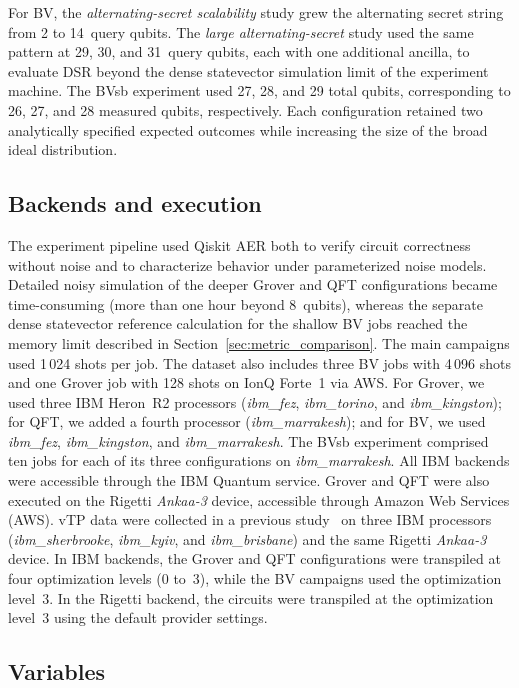 \documentclass[pdflatex,sn-mathphys-num]{sn-jnl}
\theoremstyle{thmstyleone}%
\theoremstyle{thmstyletwo}%
\theoremstyle{thmstylethree}%
\begin{document}
For BV, the \emph{alternating-secret scalability} study grew the alternating secret string from 2 to 14~query qubits. The \emph{large alternating-secret} study used the same pattern at 29, 30, and 31~query qubits, each with one additional ancilla, to evaluate DSR beyond the dense statevector simulation limit of the experiment machine. The BVsb experiment used 27, 28, and 29 total qubits, corresponding to 26, 27, and 28 measured qubits, respectively. Each configuration retained two analytically specified expected outcomes while increasing the size of the broad ideal distribution.

\subsection{Backends and execution}

The experiment pipeline used Qiskit AER both to verify circuit correctness without noise and to characterize behavior under parameterized noise models. Detailed noisy simulation of the deeper Grover and QFT configurations became time-consuming (more than one hour beyond 8~qubits), whereas the separate dense statevector reference calculation for the shallow BV jobs reached the memory limit described in Section~\ref{sec:metric_comparison}. The main campaigns used 1\,024 shots per job. The dataset also includes three BV jobs with 4\,096 shots and one Grover job with 128 shots on IonQ Forte~1 via AWS. For Grover, we used three IBM Heron~R2 processors (\textit{ibm\_fez}, \textit{ibm\_torino}, and \textit{ibm\_kingston}); for QFT, we added a fourth processor (\textit{ibm\_marrakesh}); and for BV, we used \textit{ibm\_fez}, \textit{ibm\_kingston}, and \textit{ibm\_marrakesh}. The BVsb experiment comprised ten jobs for each of its three configurations on \textit{ibm\_marrakesh}. All IBM backends were accessible through the IBM Quantum service. Grover and QFT were also executed on the Rigetti \textit{Ankaa-3} device, accessible through Amazon Web Services (AWS). vTP data were collected in a previous study~\cite{vTPMarquez_2026} on three IBM processors (\textit{ibm\_sherbrooke}, \textit{ibm\_kyiv}, and \textit{ibm\_brisbane}) and the same Rigetti \textit{Ankaa-3} device. In IBM backends, the Grover and QFT configurations were transpiled at four optimization levels (0 to~3), while the BV campaigns used the optimization level~3. In the Rigetti backend, the circuits were transpiled at the optimization level~3 using the default provider settings.

\subsection{Variables}
\end{document}
